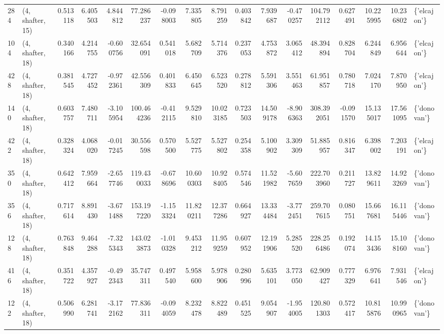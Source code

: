 \begin{tabular}{llrrrrrrrrrrrrrrl}
284 &  (4, shafter, 15) &   0.513118 &   6.405503 &   4.844812 &    77.286237 &  -0.098003 &   7.335805 &   8.791259 &  0.403842 &   7.939687 &  -0.470257 &   104.792112 &   0.627491 &  10.225995 &  10.236802 &  \{'elcajon'\} \\
104 &  (4, shafter, 18) &   0.340166 &   4.214755 &  -0.600756 &    32.654091 &   0.541018 &   5.682709 &   5.714376 &  0.237053 &   4.753872 &   3.065412 &    48.394894 &   0.828704 &   6.244849 &   6.956644 &  \{'elcajon'\} \\
428 &  (4, shafter, 18) &   0.381545 &   4.727452 &  -0.972361 &    42.556309 &   0.401833 &   6.450645 &   6.523520 &  0.278812 &   5.591306 &   3.551463 &    61.951857 &   0.780718 &   7.024170 &   7.870950 &  \{'elcajon'\} \\
140 &  (4, shafter, 18) &   0.603757 &   7.480711 &  -3.105954 &   100.464236 &  -0.412115 &   9.529810 &  10.023185 &  0.723503 &  14.509178 &  -8.906363 &   308.392051 &  -0.091570 &  15.135017 &  17.561095 &  \{'donovan'\} \\
422 &  (4, shafter, 18) &   0.328324 &   4.068020 &  -0.017245 &    30.556598 &   0.570500 &   5.527775 &   5.527802 &  0.254358 &   5.100902 &   3.309309 &    51.885957 &   0.816347 &   6.398002 &   7.203191 &  \{'elcajon'\} \\
350 &  (4, shafter, 18) &   0.642412 &   7.959664 &  -2.657746 &   119.430033 &  -0.678696 &  10.600303 &  10.928405 &  0.574546 &  11.521982 &  -5.607659 &   222.703960 &   0.211727 &  13.829611 &  14.923269 &  \{'donovan'\} \\
356 &  (4, shafter, 18) &   0.717614 &   8.891430 &  -3.671488 &   153.197220 &  -1.153324 &  11.820211 &  12.377286 &  0.664927 &  13.334484 &  -3.772451 &   259.707615 &   0.080751 &  15.667681 &  16.115446 &  \{'donovan'\} \\
128 &  (4, shafter, 18) &   0.763848 &   9.464288 &  -7.325343 &   143.023873 &  -1.010328 &   9.453212 &  11.959259 &  0.607952 &  12.191906 &   5.285520 &   228.256486 &   0.192074 &  14.153436 &  15.108160 &  \{'donovan'\} \\
416 &  (4, shafter, 18) &   0.351722 &   4.357927 &  -0.492343 &    35.747311 &   0.497540 &   5.958600 &   5.978906 &  0.280996 &   5.635101 &   3.773050 &    62.909427 &   0.777329 &   6.976641 &   7.931546 &  \{'elcajon'\} \\
122 &  (4, shafter, 18) &   0.506990 &   6.281741 &  -3.172162 &    77.836311 &  -0.094059 &   8.232478 &   8.822489 &  0.451525 &   9.054907 &  -1.954005 &   120.801303 &   0.572417 &  10.815876 &  10.990965 &  \{'donovan'\} \\

\end{tabular}
